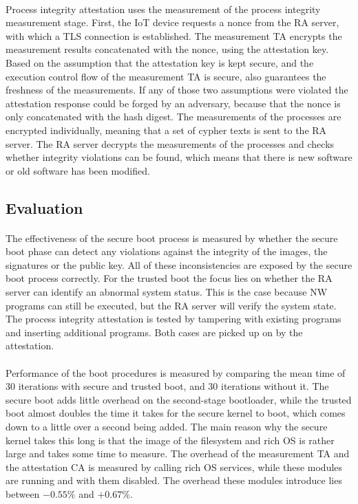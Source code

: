 \paragraph*{}
Process integrity attestation uses the measurement of the process integrity measurement stage. First, the IoT device requests a nonce from the RA server, with which a TLS connection is established. The measurement TA encrypts the measurement results concatenated with the nonce, using the attestation key. Based on the assumption that the attestation key is kept secure, and the execution control flow of the measurement TA is secure, also guarantees the freshness of the measurements. If any of those two assumptions were violated the attestation response could be forged by an adversary, because that the nonce is only concatenated with the hash digest. The measurements of the processes are encrypted individually, meaning that a set of cypher texts is sent to the RA server. The RA server decrypts the measurements of the processes and checks whether integrity violations can be found, which means that there is new software or old software has been modified.

\subsection*{Evaluation} 

\paragraph*{}
The effectiveness of the secure boot process is measured by whether the secure boot phase can detect any violations against the integrity of the images, the signatures or the public key. All of these inconsistencies are exposed by the secure boot process correctly. For the trusted boot the focus lies on whether the RA server can identify an abnormal system status. This is the case because NW programs can still be executed, but the RA server will verify the system state. The process integrity attestation is tested by tampering with existing programs and inserting additional programs. Both cases are picked up on by the attestation. 

\paragraph*{}
Performance of the boot procedures is measured by comparing the mean time of 30 iterations with secure and trusted boot, and 30 iterations without it. The secure boot adds little overhead on the second-stage bootloader, while the trusted boot almost doubles the time it takes for the secure kernel to boot, which comes down to a little over a second being added. The main reason why the secure kernel takes this long is that the image of the filesystem and rich OS is rather large and takes some time to measure. The overhead of the measurement TA and the attestation CA is measured by calling rich OS services, while these modules are running and with them disabled. The overhead these modules introduce lies between $-0.55\%$ and $+0.67\%$.

